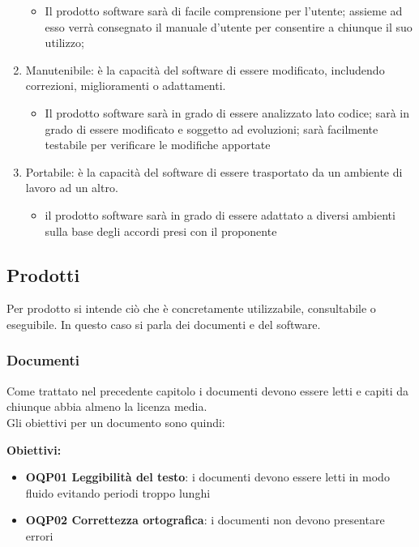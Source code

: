 \documentclass[../piano_di_qualifica.tex]{subfiles}
\begin{document}
\begin{enumerate}
\begin{itemize}
		      \item Il prodotto software sarà di facile comprensione per l’utente; assieme ad esso verrà consegnato il manuale d’utente per consentire a chiunque il suo utilizzo;
	      \end{itemize}
	\item Manutenibile: è la capacità del software di essere modificato, includendo correzioni, miglioramenti o adattamenti.
	      \begin{itemize}
		      \item Il prodotto software sarà in grado di essere analizzato lato codice; sarà in grado di essere modificato e soggetto ad evoluzioni; sarà facilmente testabile per verificare le modifiche apportate
	      \end{itemize}
	\item Portabile: è la capacità del software di essere trasportato da un ambiente di lavoro ad un altro.
	      \begin{itemize}
		      \item il prodotto software sarà in grado di essere adattato a diversi ambienti sulla base degli accordi presi con il proponente
	      \end{itemize}
\end{enumerate}

\subsection{Prodotti}
Per prodotto si intende ciò che è concretamente utilizzabile, consultabile o eseguibile. In questo caso si parla dei documenti e del software.

\subsubsection{Documenti}
Come trattato nel precedente capitolo i documenti devono essere letti e capiti da chiunque abbia almeno la licenza media.\\
Gli obiettivi per un documento sono quindi:

\textbf{Obiettivi:}
\smallbreak
\begin{itemize}
	\item \textbf{OQP01 Leggibilità del testo}: i documenti devono essere letti in modo fluido evitando periodi troppo lunghi \\
	\item \textbf{OQP02 Correttezza ortografica}: i documenti non devono presentare errori
\end{itemize}
\end{document}
